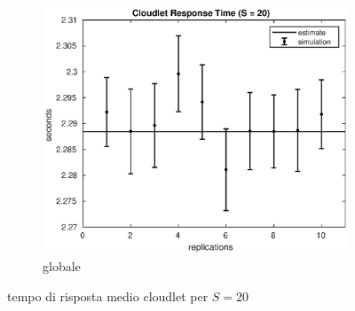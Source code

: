 \begin{figure}[!h]
\begin{subfigure}[t]{0.5\textwidth}
\includegraphics[width=\textwidth]{figures/simul/20_500K_sclet}
\caption{globale}
\label{20_sclet}
\end{subfigure}
%
\caption{tempo di risposta medio cloudlet per $S = 20$}
\end{figure}
%


